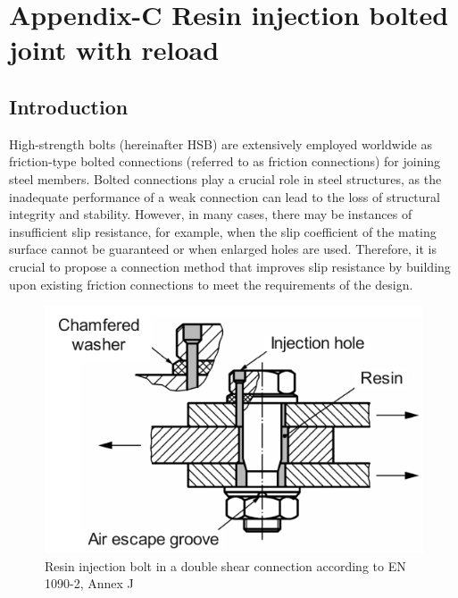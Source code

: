 \chapter{Appendix-C Resin injection bolted joint with reload}
\label{app3}
\onehalfspacing

\section{Introduction}

 High-strength bolts (hereinafter HSB) are extensively employed worldwide as friction-type bolted connections (referred to as friction connections) for joining steel members. Bolted connections play a crucial role in steel structures, as the inadequate performance of a weak connection can lead to the loss of structural integrity and stability. However, in many cases, there may be instances of insufficient slip resistance, for example, when the slip coefficient of the mating surface cannot be guaranteed or when enlarged holes are used. Therefore, it is crucial to propose a connection method that improves slip resistance by building upon existing friction connections to meet the requirements of the design.

\begin{figure}[htbp]
    \centering
    \includegraphics[width=0.75\linewidth]{imgs//app3/iR-mecha.pdf}
    \caption{Resin injection bolt in a double shear connection according to EN 1090-2, Annex J}
    \label{fig-RI-mecha}
\end{figure}
    

